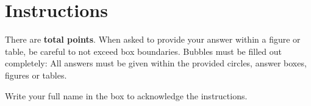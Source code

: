 \section*{Instructions}

\begin{small}
There are {\bf 
{} total points}.
When asked to provide your answer within a figure or table, be careful to not
exceed box boundaries. Bubbles must be filled out completely: 
 
All answers must be given within the provided circles, answer boxes,
figures or tables. 
\end{small}
\vspace*{-0.25in}
Write your full name in the box to acknowledge the instructions. 
\eprob
